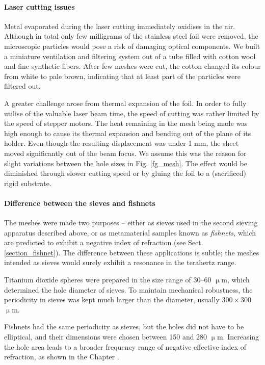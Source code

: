 \paragraph{Laser cutting issues}%
Metal evaporated during the laser cutting immediately oxidises in the air. Although in total only few milligrams of the stainless steel foil were removed, the microscopic particles would pose a risk of damaging optical components. We built a miniature ventilation and filtering system out of a tube filled with cotton wool and fine synthetic fibers. After few meshes were cut, the cotton changed its colour from white to pale brown, indicating that at least part of the particles were filtered out.

A greater challenge arose from thermal expansion of the foil. In order to fully utilise of the valuable laser beam time, the speed of cutting was rather limited by the speed of stepper motors. The heat remaining in the mesh being made was high enough to cause its thermal expansion and bending out of the plane of its holder. Even though the resulting displacement was under 1 mm, the sheet moved significantly out of the beam focus. We assume this was the reason for slight variations between the hole sizes in Fig. \ref{fg_mesh}. The effect would be diminished through slower cutting speed or by gluing the foil to a (sacrificed) rigid substrate.

\paragraph{Difference between the sieves and fishnets}%
The meshes were made two purposes -- either as sieves used in the second sieving apparatus described above, or as metamaterial samples known as \textit{fishnets}, which are predicted to exhibit a negative index of refraction (see Sect. \ref{section_fishnet}). The difference between these applications is subtle; the meshes intended as sieves would surely exhibit a resonance in the terahertz range. 

Titanium dioxide spheres were prepared in the size range of 30--60 $\upmu$m, which determined the hole diameter of sieves. To maintain mechanical robustness, the periodicity in sieves was kept much larger than the diameter, usually $300\times 300$ $\upmu$m. 

Fishnets had the same periodicity as sieves, but the holes did not have to be elliptical, and their dimensions were chosen between 150 and 280 $\upmu$m. Increasing the hole area leads to a broader frequency range of negative effective index of refraction, as shown in the Chapter \pageref{section_fishnet}. 

